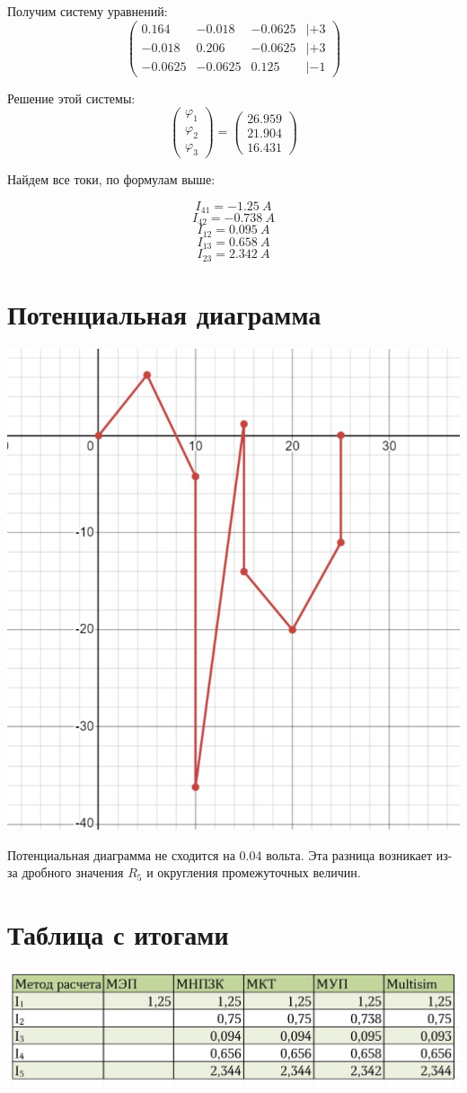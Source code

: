 \documentclass[14pt, a4paper]{article}
\begin{document}
    Получим систему уравнений:
    $$
    \begin{pmatrix}
        0.164 & -0.018 & -0.0625 & | + 3 \\
        -0.018 & 0.206 & -0.0625 & | + 3 \\
        -0.0625 & -0.0625 & 0.125 & | -1
    \end{pmatrix}
    $$

    Решение этой системы:
    $$
    \begin{pmatrix}
        \varphi_1 \\ \varphi_2 \\ \varphi_3
    \end{pmatrix} = 
    \begin{pmatrix}
        26.959 \\ 21.904 \\ 16.431
    \end{pmatrix}
    $$

    Найдем все токи, по формулам выше:

    $$I_{41} = -1.25 \ A$$
    $$I_{42} = -0.738 \ A$$
    $$I_{12} = 0.095 \ A$$
    $$I_{13} = 0.658 \ A$$
    $$I_{23} = 2.342 \ A$$

\section*{Потенциальная диаграмма}

\includegraphics[width=1\textwidth]{diagram.jpg}

Потенциальная диаграмма не сходится на 0.04 вольта. Эта разница возникает 
из-за дробного значения $R_5$ и округления промежуточных величин.

\section*{Таблица с итогами}

\includegraphics[width=1\textwidth]{result.jpg}
\end{document}
